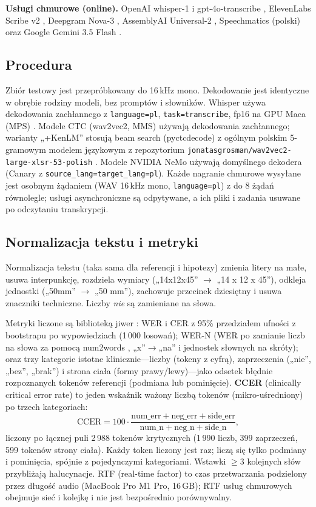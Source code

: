\documentclass[conference]{IEEEtran}
\begin{document}
\noindent\textbf{Usługi chmurowe (online).} OpenAI whisper-1 i gpt-4o-transcribe \cite{r11}, ElevenLabs Scribe v2 \cite{r12}, Deepgram Nova-3 \cite{r13}, AssemblyAI Universal-2 \cite{r14}, Speechmatics (polski) \cite{r15} oraz Google Gemini 3.5 Flash \cite{r16}.

\subsection{Procedura}
Zbiór testowy jest przepróbkowany do 16\,kHz mono. Dekodowanie jest identyczne w obrębie rodziny modeli, bez promptów i słowników. Whisper używa dekodowania zachłannego z \texttt{language=pl}, \texttt{task=transcribe}, fp16 na GPU Maca (MPS) \cite{r2,r17}. Modele CTC (wav2vec2, MMS) używają dekodowania zachłannego; warianty „+KenLM'' stosują beam search (pyctcdecode) z ogólnym polskim 5-gramowym modelem językowym z repozytorium \texttt{jonatasgrosman/wav2vec2-large-xlsr-53-polish} \cite{r9,r19,r20}. Modele NVIDIA NeMo używają domyślnego dekodera (Canary z \texttt{source\_lang=target\_lang=pl}). Każde nagranie chmurowe wysyłane jest osobnym żądaniem (WAV 16\,kHz mono, \texttt{language=pl}) z do 8 żądań równolegle; usługi asynchroniczne są odpytywane, a ich pliki i zadania usuwane po odczytaniu transkrypcji.

\subsection{Normalizacja tekstu i metryki}
Normalizacja tekstu (taka sama dla referencji i hipotezy) zmienia litery na małe, usuwa interpunkcję, rozdziela wymiary („14x12x45'' $\to$ „14 x 12 x 45''), odkleja jednostki („50mm'' $\to$ „50 mm''), zachowuje przecinek dziesiętny i usuwa znaczniki techniczne. Liczby \emph{nie} są zamieniane na słowa.

Metryki liczone są biblioteką jiwer \cite{r18}: WER i CER z 95\% przedziałem ufności z bootstrapu po wypowiedziach (1\,000 losowań); WER-N (WER po zamianie liczb na słowa za pomocą num2words \cite{r23}, „x''$\to$„na'' i jednostek słownych na skróty); oraz trzy kategorie istotne klinicznie---liczby (tokeny z cyfrą), zaprzeczenia („nie'', „bez'', „brak'') i strona ciała (formy prawy/lewy)---jako odsetek błędnie rozpoznanych tokenów referencji (podmiana lub pominięcie). \textbf{CCER} (clinically critical error rate) to jeden wskaźnik ważony liczbą tokenów (mikro-uśredniony) po trzech kategoriach:
\begin{equation}
\mathrm{CCER} = 100\cdot\frac{\text{num\_err}+\text{neg\_err}+\text{side\_err}}{\text{num\_n}+\text{neg\_n}+\text{side\_n}},
\end{equation}
liczony po łącznej puli 2\,988 tokenów krytycznych (1\,990 liczb, 399 zaprzeczeń, 599 tokenów strony ciała). Każdy token liczony jest raz; liczą się tylko podmiany i pominięcia, spójnie z pojedynczymi kategoriami. Wstawki $\ge 3$ kolejnych słów przybliżają halucynacje. RTF (real-time factor) to czas przetwarzania podzielony przez długość audio (MacBook Pro M1 Pro, 16\,GB); RTF usług chmurowych obejmuje sieć i kolejkę i nie jest bezpośrednio porównywalny.
\end{document}
